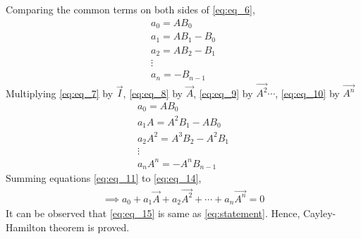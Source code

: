 \documentclass[journal,12pt,twocolumn]{IEEEtran}
\begin{document}
Comparing the common terms on both sides of \eqref{eq:eq_6},
\begin{align}
    a_0 = AB_0  \label{eq:eq_7}\\
    a_1 = AB_1-B_0 \label{eq:eq_8}\\
    a_2 = AB_2-B_1 \label{eq:eq_9}\\
    \vdots \nonumber \\
    a_n = -B_{n-1} \label{eq:eq_10}
\end{align}
Multiplying \eqref{eq:eq_7} by $\vec{I}$, \eqref{eq:eq_8} by $\vec{A}$, \eqref{eq:eq_9} by $\vec{A^2} \cdots $, \eqref{eq:eq_10} by $\vec{A^n}$
\begin{align}
    a_0 = AB_0  \label{eq:eq_11}\\
    a_1A = A^2B_1-AB_0 \label{eq:eq_12}\\
    a_2A^2 = A^3B_2-A^2B_1 \label{eq:eq_13}\\
    \vdots \nonumber \\
    a_nA^n = -A^nB_{n-1} \label{eq:eq_14}
\end{align}
Summing equations \eqref{eq:eq_11} to \eqref{eq:eq_14},
\begin{align} \label{eq:eq_15}
    \implies a_0+a_1\vec{A}+a_2\vec{A^2}+\cdots+a_n\vec{A^n} = 0
\end{align}
It can be observed that \eqref{eq:eq_15} is same as \eqref{eq:statement}. Hence, Cayley-Hamilton theorem is proved.
\end{document}
